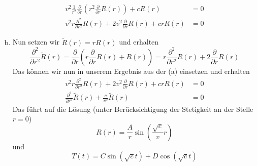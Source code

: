 \documentclass{article}
\theoremstyle{definition}
\begin{document}
\begin{enumerate}[(a)]
\begin{align*}
        v^2\frac{1}{r^2}\frac{\partial}{\partial r}\left(r^2\frac{\partial}{\partial r}R(r)\right) + cR(r) &= 0\\
        v^2r\frac{\partial^2}{\partial r^2}R(r) + 2v^2\frac{\partial}{\partial r}R(r) + crR(r) &= 0
    \end{align*}
    \item Nun setzen wir $\tilde{R}(r) = rR(r)$ und erhalten
    $$\frac{\partial^2}{\partial r^2} \tilde{R}(r) = \frac{\partial}{\partial r}\left(r \frac{\partial}{\partial r}R(r) + R(r)\right) = r \frac{\partial^2}{\partial r^2} R(r) + 2 \frac{\partial}{\partial r}R(r)$$
    Das können wir nun in unserem Ergebnis aus der (a) einsetzen und erhalten
    \begin{align*}
        v^2r\frac{\partial^2}{\partial r^2}R(r) + 2v^2\frac{\partial}{\partial r}R(r) + crR(r) &= 0\\
        \frac{\partial^2}{\partial r^2} \tilde{R}(r) + \frac{c}{v^2}\tilde{R}(r) &= 0
    \end{align*}
    Das führt auf die Lösung (unter Berücksichtigung der Stetigkeit an der Stelle $r = 0$)
    $$R(r) = \frac{A}{r}\sin(\frac{\sqrt{c}}{v} r)$$ und $$T(t) = C \sin(\sqrt{c} t) + D \cos(\sqrt{c} t)$$
\end{enumerate}
\end{document}
